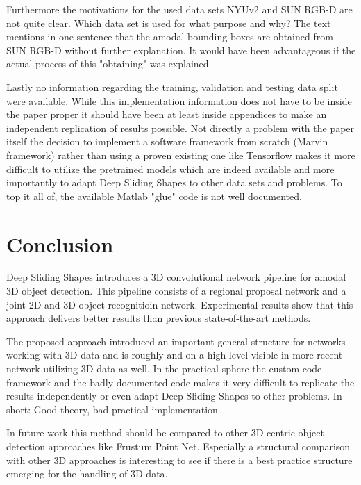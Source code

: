 \documentclass[12pt]{scrartcl}
\begin{document}
Furthermore the motivations for the used data sets NYUv2 and SUN RGB-D are
not quite clear. Which data set is used for what purpose and why? The text
mentions in one sentence that the amodal bounding boxes are obtained from
SUN RGB-D without further explanation. It would have been advantageous
if the actual process of this "obtaining" was explained.

Lastly no information regarding the training, validation and testing data split were
available. While this implementation information does not have to be inside the
paper proper it should have been at least inside appendices to make an independent
replication of results possible. Not directly a problem with the paper itself the decision to
implement a software framework from scratch (Marvin framework) rather than using
a proven existing one like Tensorflow makes it more difficult to utilize the
pretrained models which are indeed available and more importantly to adapt Deep
Sliding Shapes to other data sets and problems. To top it all of, the available
Matlab "glue" code is not well documented.



\section{Conclusion}

Deep Sliding Shapes introduces a 3D convolutional network pipeline for
amodal 3D object detection. This pipeline consists of a regional proposal
network and a joint 2D and 3D object recognitioin network. Experimental
results show that this approach delivers better results than previous
state-of-the-art methods.

The proposed approach introduced an important general structure for networks
working with 3D data and is roughly and on a high-level visible in more recent
network utilizing 3D data as well. In the practical sphere the custom code
framework and the badly documented code makes it very difficult to replicate the
results independently or even adapt Deep Sliding Shapes to other problems.
In short: Good theory, bad practical implementation.

In future work this method should be compared to other 3D centric object detection
approaches like Frustum Point Net\cite{Qi2017}. Especially a structural comparison
with other 3D approaches is interesting to see if there is a best practice structure
emerging for the handling of 3D data.

\newpage
\printbibliography
{}%
\end{document}
